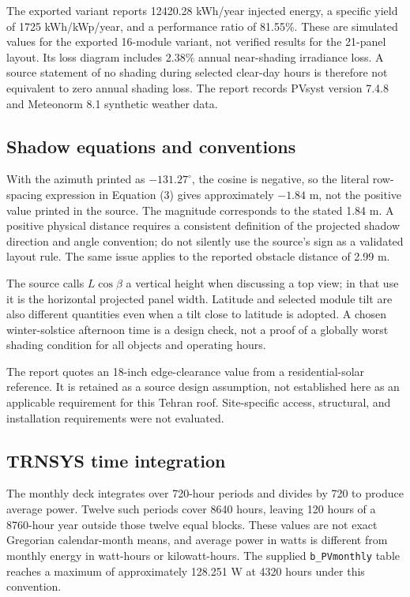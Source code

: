 \documentclass[11pt,a4paper]{article}
\begin{document}
The exported variant reports 12420.28 kWh/year injected energy, a specific yield of 1725 kWh/kWp/year, and a performance ratio of 81.55\%. These are simulated values for the exported 16-module variant, not verified results for the 21-panel layout. Its loss diagram includes 2.38\% annual near-shading irradiance loss. A source statement of no shading during selected clear-day hours is therefore not equivalent to zero annual shading loss. The report records PVsyst version 7.4.8 and Meteonorm 8.1 synthetic weather data.
\subsection{Shadow equations and conventions}
With the azimuth printed as $-131.27^\circ$, the cosine is negative, so the literal row-spacing expression in Equation (3) gives approximately $-1.84$ m, not the positive value printed in the source. The magnitude corresponds to the stated 1.84 m. A positive physical distance requires a consistent definition of the projected shadow direction and angle convention; do not silently use the source's sign as a validated layout rule. The same issue applies to the reported obstacle distance of 2.99 m.

The source calls $L\cos\beta$ a vertical height when discussing a top view; in that use it is the horizontal projected panel width. Latitude and selected module tilt are also different quantities even when a tilt close to latitude is adopted. A chosen winter-solstice afternoon time is a design check, not a proof of a globally worst shading condition for all objects and operating hours.

The report quotes an 18-inch edge-clearance value from a residential-solar reference. It is retained as a source design assumption, not established here as an applicable requirement for this Tehran roof. Site-specific access, structural, and installation requirements were not evaluated.
\subsection{TRNSYS time integration}
The monthly deck integrates over 720-hour periods and divides by 720 to produce average power. Twelve such periods cover 8640 hours, leaving 120 hours of a 8760-hour year outside those twelve equal blocks. These values are not exact Gregorian calendar-month means, and average power in watts is different from monthly energy in watt-hours or kilowatt-hours. The supplied \texttt{b\_PVmonthly} table reaches a maximum of approximately 128.251 W at 4320 hours under this convention.
\end{document}
